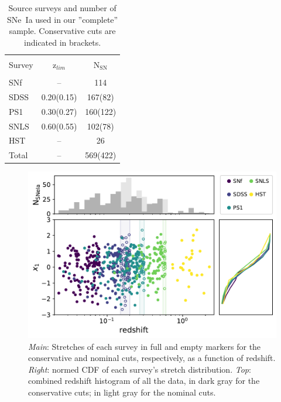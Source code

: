 \documentclass[]{aa} %
\newcommand{\nn}[1]{{\textcolor[rgb]{1, 0.27, 0}{#1}}}
\begin{document}
\begin{table}
    \centering
    \caption{\nn{Source surveys and number of SNe~Ia used in our ''complete''
    sample. Conservative cuts are indicated in brackets.}}
    \label{tab:sample}
    \begin{tabular}{l c c}
    \hline\hline\\[-0.8em]
        Survey & z$_{lim}$ & N$_{\mathrm{SN}}$ \\[0.15em]
        \hline\\[-0.8em]
        SNf & -- & 114\\[0.30em]
        SDSS & 0.20(0.15) & 167(82)\\[0.30em]
        PS1 & 0.30(0.27) & 160(122)\\[0.30em]        
        SNLS & 0.60(0.55) & 102(78)\\[0.30em]
        HST & -- & 26\\[0.30em]
        Total & -- & 569(422)\\[0.30em]
        \hline
    \end{tabular}
\end{table}

\begin{figure}
    \centering
    \includegraphics[width=0.95\linewidth]{Article_figures/stretchs-cut_btw_hist_cumu_75.pdf}
    \caption{\nn{\textit{Main}: Stretches of each survey in full and empty markers for the
    conservative and nominal cuts, respectively, as a function of redshift. \textit{Right}:
    normed CDF of each survey's stretch distribution. \textit{Top}: combined redshift 
    histogram of all the data, in dark gray for the conservative cuts;
    in light gray for the nominal cuts.}}
    \label{fig:sample}
\end{figure}
\end{document}
